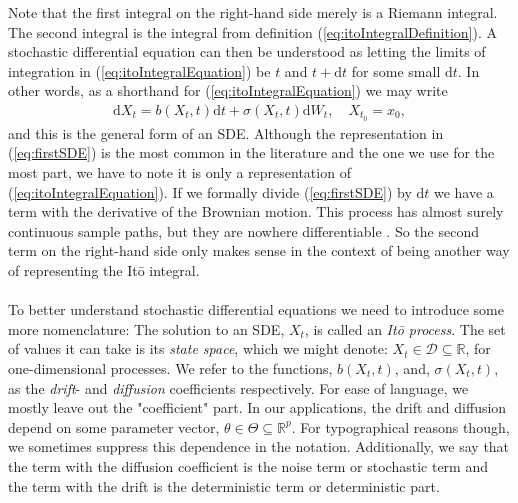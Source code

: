 Note that the first integral on the right-hand side merely is a Riemann integral. The second integral is the integral from definition (\ref{eq:itoIntegralDefinition}). A stochastic differential equation can then be understood as letting the limits of integration in (\ref{eq:itoIntegralEquation}) be $t$ and $t+\mathrm{d}t$ for some small $\mathrm{d}t$. In other words, as a shorthand for (\ref{eq:itoIntegralEquation}) we may write
\begin{align}
    \mathrm{d}X_t = b(X_t, t)\mathrm{d}t + \sigma(X_t, t)\mathrm{d}W_t, \quad X_{t_0} = x_0 \label{eq:firstSDE},
\end{align}
and this is the general form of an SDE. Although the representation in (\ref{eq:firstSDE}) is the most common in the literature and the one we use for the most part, we have to note it is only a representation of (\ref{eq:itoIntegralEquation}). If we formally divide (\ref{eq:firstSDE}) by $\mathrm{d}t$ we have a term with the derivative of the Brownian motion. This process has almost surely continuous sample paths, but they are nowhere differentiable \cite[theorem 11.22 and theorem 11.35]{Hansen2022}. So the second term on the right-hand side only makes sense in the context of being another way of representing the Itō integral. \\\\
To better understand stochastic differential equations we need to introduce some more nomenclature: The solution to an SDE, $X_t$, is called an \textit{Itō process}. The set of values it can take is its \textit{state space}, which we might denote: $X_t\in\mathcal{D}\subseteq\mathbb{R}$, for one-dimensional processes. We refer to the functions, $b(X_t, t)$, and, $\sigma(X_t, t)$, as the \textit{drift}- and \textit{diffusion} coefficients respectively. For ease of language, we mostly leave out the "coefficient" part. In our applications, the drift and diffusion depend on some parameter vector, $\theta\in\Theta\subseteq\mathbb{R}^p$. For typographical reasons though, we sometimes suppress this dependence in the notation. Additionally, we say that the term with the diffusion coefficient is the noise term or stochastic term and the term with the drift is the deterministic term or deterministic part. 

